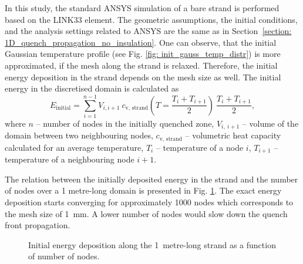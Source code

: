 
In this study, the standard ANSYS simulation of a bare strand is performed based on the LINK33 element. The geometric assumptions, the initial conditions, and the analysis settings related to ANSYS are the same as in Section~\ref{section: 1D_quench_propagation_no_insulation}. One can observe, that the initial Gaussian temperature profile (see Fig. \ref{fig: init_gauss_temp_distr}) is more approximated, if the mesh along the strand is relaxed. Therefore, the initial energy deposition in the strand depends on the mesh size as well. The initial energy in the discretised domain is calculated as
\begin{equation}
    E_\text{initial} = \sum_{i=1}^{n-1} V_{i,i+1}~c_\text{v, strand}\left(T = \frac{T_i+T_{i+1}}{2}\right)~\frac{T_i+T_{i+1}}{2},
\end{equation}
where $n$ -- number of nodes in the initially quenched zone, $V_{i,~i+1}$ -- volume of the domain between two neighbouring nodes, $c_\text{v, strand}$ -- volumetric heat capacity calculated for an average temperature, $T_i$ -- temperature of a node $i$, $T_{i+1}$ -- temperature of a neighbouring node $i+1$.

The relation between the initially deposited energy in the strand and the number of nodes over a 1 metre-long domain is presented in Fig. \ref{fig: q_vel_modelling_energy_deposition}. The exact energy deposition starts converging for approximately 1000 nodes which corresponds to the mesh size of 1~mm. A lower number of nodes would slow down the quench front propagation.

\begin{figure}[H]
    \centering
    \caption{Initial energy deposition along the 1~metre-long strand as a function of number of nodes.}
    \label{fig: q_vel_modelling_energy_deposition}
\end{figure}

